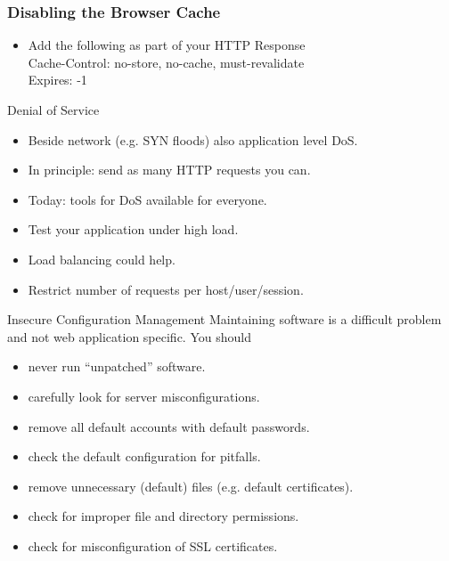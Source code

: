 \documentclass{beamer}
\begin{document}
\begin{frame}
  \frametitle{Disabling the Browser Cache}
  \begin{itemize}
  \item Add the following as part of your HTTP Response\\[1.5ex]
    Cache-Control: no-store, no-cache, must-revalidate\\
    Expires: -1
  \end{itemize}
\end{frame}



\begin{slide}{Denial of Service}
  \begin{itemize}
    \item Beside network (e.g. SYN floods) also application level DoS.
    \item In principle: send as many HTTP requests you can.
    \item Today: tools for DoS available for everyone.
    \item Test your application under high load.
    \item Load balancing could help.
    \item Restrict number of requests per host/user/session.
  \end{itemize}
\end{slide}
\begin{printout}
\begin{slide}{Insecure Configuration Management}
  Maintaining software is a difficult problem and not web application 
  specific. You should 
  \begin{itemize}
    \item never run ``unpatched'' software.
    \item carefully look for server misconfigurations.
    \item remove all default accounts with default passwords.
    \item check the default configuration for pitfalls.
    \item remove unnecessary (default) files (e.g. default certificates).
    \item check for improper file and directory permissions.
    \item check for misconfiguration of SSL certificates.
  \end{itemize}
\end{slide}
\end{printout}
\end{document}
